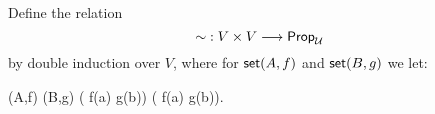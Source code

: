 \documentclass[hott-all.tex]{subfiles}
\begin{document}
%
%
%
% 
%
% 
%
%
% 
\begin{defn}
  Define the 
  relation
  \begin{equation*}
    \mathord{\sim} : V \times V \longrightarrow \mathsf{Prop}_{\mathcal{U}}
  \end{equation*}
  by double induction over $V$, where for $\mathsf{set}(A,f)$ and $\mathsf{set}(B,g)$ we let:
  \begin{narrowmultline*}
    \vset(A,f)  \bisim \vset(B,g)  \narrowbreak
    \big( f(a)  \bisim g(b)\big) \land
    \big( f(a) \bisim g(b)\big).
  \end{narrowmultline*}
\end{defn}
\end{document}
